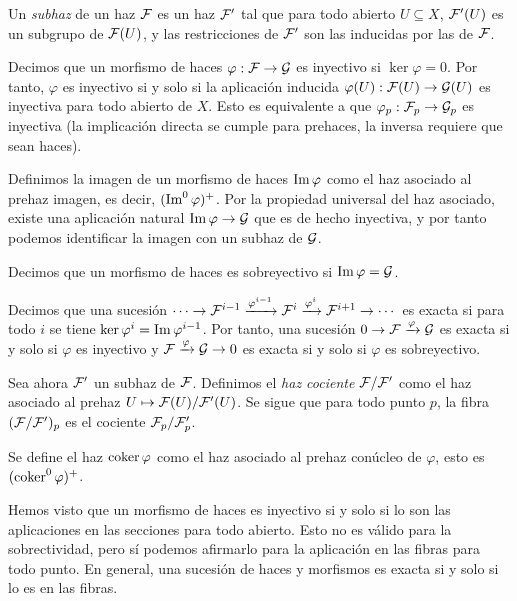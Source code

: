\documentclass[GA.tex]{subfiles}
\begin{document}
\begin{defi}
Un \emph{subhaz} de un haz $\mathcal{F}$ es un haz $\mathcal{F}'$ tal que para todo abierto $U\subseteq X$, $\mathcal{F}'(U)$ es un subgrupo de $\mathcal{F}(U)$, y las restricciones de $\mathcal{F}'$ son las inducidas por las de $\mathcal{F}$. 

Decimos que un morfismo de haces $\varphi:\mathcal{F}\to\mathcal{G}$ es inyectivo si $\ker\varphi=0$. Por tanto, $\varphi$ es inyectivo si y solo si la aplicación inducida $\varphi(U):\mathcal{F}(U)\to\mathcal{G}(U)$ es inyectiva para todo abierto de $X$. Esto es equivalente a que $\varphi_p:\mathcal{F}_p\to \mathcal{G}_p$ es inyectiva (la implicación directa se cumple para prehaces, la inversa requiere que sean haces). 

Definimos la imagen de un morfismo de haces $\operatorname{Im}\varphi$ como el haz asociado al prehaz imagen, es decir, $(\operatorname{Im}^0\varphi)^+$. Por la propiedad universal del haz asociado, existe una aplicación natural $\operatorname{Im}\varphi\to\mathcal{G}$ que es de hecho inyectiva, y por tanto podemos identificar la imagen con un subhaz de $\mathcal{G}$. 

Decimos que un morfismo de haces es sobreyectivo si $\operatorname{Im}\varphi=\mathcal{G}$.

Decimos que una sucesión $\cdots\to\mathcal{F}^{i-1}\xrightarrow{\varphi^{i-1}}\mathcal{F}^i\xrightarrow{\varphi^i}\mathcal{F}^{i+1}\to\cdots$ es exacta si para todo $i$ se tiene $\ker\varphi^i=\operatorname{Im}\varphi^{i-1}$. Por tanto, una sucesión $0\to\mathcal{F}\xrightarrow{\varphi}\mathcal{G}$ es exacta si y solo si $\varphi$ es inyectivo y $\mathcal{F}\xrightarrow{\varphi}\mathcal{G}\to 0$ es exacta si y solo si $\varphi$ es sobreyectivo. 

Sea ahora $\mathcal{F}'$ un subhaz de $\mathcal{F}$. Definimos el \emph{haz cociente} $\mathcal{F}/\mathcal{F}'$ como el haz asociado al prehaz $U\mapsto \mathcal{F}(U)/\mathcal{F}'(U)$. Se sigue que para todo punto $p$, la fibra $(\mathcal{F}/\mathcal{F}')_p$ es el cociente $\mathcal{F}_p/\mathcal{F}'_p$.

Se define el haz $\operatorname{coker}\varphi$ como el haz asociado al prehaz conúcleo de $\varphi$, esto es $(\operatorname{coker}^0\varphi)^+$. 
\end{defi}

\begin{nota}
Hemos visto que un morfismo de haces es inyectivo si y solo si lo son las aplicaciones en las secciones para todo abierto. Esto no es válido para la sobrectividad, pero sí podemos afirmarlo para la aplicación en las fibras para todo punto. En general, una sucesión de haces y morfismos es exacta si y solo si lo es en las fibras. 
\end{nota}
\end{document}
